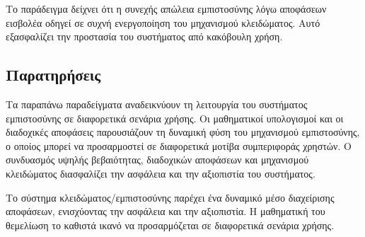 Το παράδειγμα δείχνει ότι η συνεχής απώλεια εμπιστοσύνης λόγω αποφάσεων εισβολέα οδηγεί σε συχνή ενεργοποίηση του μηχανισμού κλειδώματος. Αυτό εξασφαλίζει την προστασία του συστήματος από κακόβουλη χρήση.

\subsection{Παρατηρήσεις}
Τα παραπάνω παραδείγματα αναδεικνύουν τη λειτουργία του συστήματος εμπιστοσύνης σε διαφορετικά σενάρια χρήσης. Οι μαθηματικοί υπολογισμοί και οι διαδοχικές αποφάσεις παρουσιάζουν τη δυναμική φύση του μηχανισμού εμπιστοσύνης, ο οποίος μπορεί να προσαρμοστεί σε διαφορετικά μοτίβα συμπεριφοράς χρηστών. Ο συνδυασμός υψηλής βεβαιότητας, διαδοχικών αποφάσεων και μηχανισμού κλειδώματος διασφαλίζει την ασφάλεια και την αξιοπιστία του συστήματος.

Το σύστημα κλειδώματος/εμπιστοσύνης παρέχει ένα δυναμικό μέσο διαχείρισης αποφάσεων, ενισχύοντας την ασφάλεια και την αξιοπιστία. Η μαθηματική του θεμελίωση το καθιστά ικανό να προσαρμόζεται σε διαφορετικά σενάρια χρήσης.
